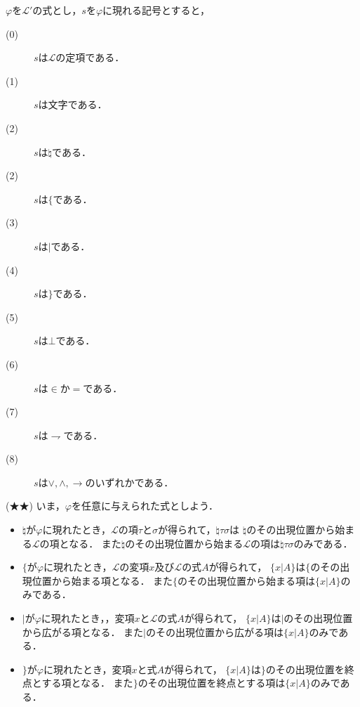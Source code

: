 \documentclass[a4j,10.5pt,oneside,openany]{jsbook}
\begin{document}
	$\varphi$を$\mathcal{L}'$の式とし，$s$を$\varphi$に現れる記号とすると，
	\begin{description}
		\item[(0)] $s$は$\mathcal{L}$の定項である．
		\item[(1)] $s$は文字である．
		\item[(2)] $s$は$\natural$である．
		\item[(2)] $s$は$\{$である．
		\item[(3)] $s$は$|$である．
		\item[(4)] $s$は$\}$である．
		\item[(5)] $s$は$\bot$である．
		\item[(6)] $s$は$\in$か$=$である．
		\item[(7)] $s$は$\rightharpoondown$である．
		\item[(8)] $s$は$\vee,\wedge,\rightarrow$のいずれかである．
	\end{description}
	
	\begin{screen}
		(★★) いま，$\varphi$を任意に与えられた式としよう．
		\begin{itemize}
			\item $\natural$が$\varphi$に現れたとき，$\mathcal{L}$の項$\tau$と$\sigma$が得られて，$\natural \tau \sigma$は
				$\natural$のその出現位置から始まる$\mathcal{L}$の項となる．
				また$\natural$のその出現位置から始まる$\mathcal{L}$の項は$\natural \tau \sigma$のみである．
				
			\item $\{$が$\varphi$に現れたとき，$\mathcal{L}$の変項$x$及び$\mathcal{L}$の式$A$が得られて，
				$\{ x|A\}$は$\{$のその出現位置から始まる項となる．
				また$\{$のその出現位置から始まる項は$\{x|A\}$のみである．
				
			\item $|$が$\varphi$に現れたとき，，変項$x$と$\mathcal{L}$の式$A$が得られて，
				$\{x|A\}$は$|$のその出現位置から広がる項となる．
				また$|$のその出現位置から広がる項は$\{x|A\}$のみである．
				
			\item $\}$が$\varphi$に現れたとき，変項$x$と式$A$が得られて，
				$\{x|A\}$は$\}$のその出現位置を終点とする項となる．
				また$\}$のその出現位置を終点とする項は$\{x|A\}$のみである．
		\end{itemize}
	\end{screen}
	
\end{document}
